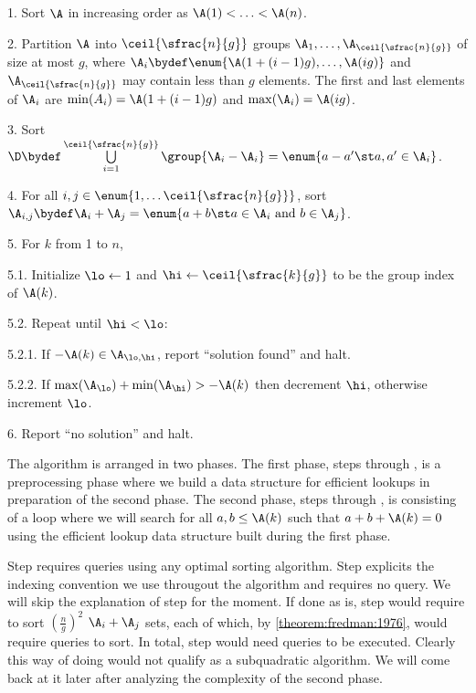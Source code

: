 \begin{algorithm}

\item[1.] Sort $\A$ in increasing order as $\A(1) < \ldots < \A(n)$.

\item[2.] Partition $\A$ into $\ceil{\sfrac{n}{g}}$ groups $\A_1, \ldots,
\A_{\ceil{\sfrac{n}{g}}}$ of size at most $g$, where $\A_i \bydef \enum{\A(1 + (i-1)g),
\ldots, \A(ig)}$ and $\A_{\ceil{\sfrac{n}{g}}}$ may contain less than $g$ elements.
The first and last elements of $\A_i$ are $\min(A_i) = \A(1 + (i-1)g)$ and
$\max(\A_i) = \A(ig)$.

\item[3.] Sort $\D \bydef \bigcup\limits_{i = 1}^{\ceil{\sfrac{n}{g}}}
\group{\A_i-\A_i} = \enum{a - a' \st a, a' \in \A_i}$.

\item[4.] For all $i,j \in \enum{1, \ldots \ceil{\sfrac{n}{g}}}$, sort $\A_{i,j}
\bydef \A_i + \A_j = \enum{a + b \st a \in \A_i \text{ and } b \in \A_j}$.

\item[5.] For $k$ from 1 to $n$,

\item[5.1.] Initialize $\lo \gets 1$ and $\hi \gets \ceil{\sfrac{k}{g}}$ to be
the group index of $\A(k)$.

\item[5.2.] Repeat until $\hi < \lo$:

\item[5.2.1.] If $-\A(k) \in \A_{\lo,\hi}$, report ``solution found'' and halt.

\item[5.2.2.] If $\max(\A_{\lo}) + \min(\A_{\hi}) > -\A(k)$ then decrement
$\hi$, otherwise increment $\lo$.

\item[6.] Report ``no solution'' and halt.

\end{algorithm}

The algorithm is arranged in two phases. The first phase, steps 
through , is a preprocessing phase where we build a data structure
for efficient lookups in preparation of the second phase. The second phase, steps
 through , is consisting of a loop where we will search
for all $a, b \le \A(k)$ such that $a + b + \A(k) = 0$ using the efficient lookup
data structure built during the first phase.

Step  requires  queries using any optimal sorting
algorithm. Step  explicits
the indexing convention we use througout the algorithm and requires no query.
We will skip the explanation of step  for the moment. If done as is,
step  would require to sort $(\frac{n}{g})^2$ $\A_i + \A_j$ sets,
each of which, by \ref{theorem:fredman:1976}, would require  queries
to sort. In total, step  would need  queries to be
executed. Clearly this way of doing would not qualify as a subquadratic
algorithm. We will come back at it later after analyzing the complexity of the
second phase.

